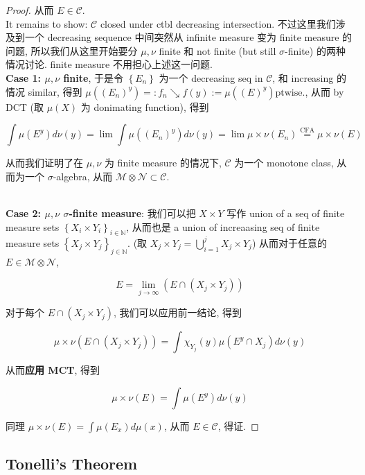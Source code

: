 \documentclass{qlnotes-export}
\begin{document}
\begin{proof}
从而 \(E \in \mathcal{C}\).\\
It remains to show: \(\mathcal{C}\) closed under ctbl decreasing intersection. 不过这里我们涉及到一个 decreasing sequence 中间突然从 infinite measure 变为 finite measure 的问题, 所以我们从这里开始要分 \(\mu,\nu\) finite 和 not finite (but still \(\sigma\)-finite) 的两种情况讨论. finite measure 不用担心上述这一问题.\\
\textbf{Case 1: \(\mu,\nu\) finite}, 于是令 \(\left\{ E_{n} \right\}\) 为一个 decreasing seq in \(\mathcal{C}\), 和 increasing 的情况 similar, 得到 \(\mu((E_{n})^{y}) = :f_{n}\operatorname{\searrow ︎}f(y) := \mu((E)^{y})\text{ptwise.}\), 从而 by DCT (取 \(\mu(X)\) 为 donimating function), 得到

\[\int\mu(E^{y}) d\nu(y) = \lim\int\mu((E_{n})^{y}) d\nu(y) = \lim\mu \times \nu(E_{n})\overset{\text{CFA}}{=}\mu \times \nu(E)\]

从而我们证明了在 \(\mu,\nu\) 为 finite measure 的情况下, \(\mathcal{C}\) 为一个 monotone class, 从而为一个 \(\sigma\)-algebra, 从而 \(\mathcal{M} \otimes \mathcal{N} \subset \mathcal{C}\).\\
\strut \\
\textbf{Case 2: \(\mu,\nu\) \(\sigma\)-finite measure}: 我们可以把 \(X \times Y\) 写作 union of a seq of finite measure sets \(\left\{ {X_{i} \times Y_{i}} \right\}_{i \in {\mathbb{N}}}\), 从而也是 a union of increaasing seq of finite measure sets \(\left\{ {X_{j} \times Y_{j}} \right\}_{j \in {\mathbb{N}}}\). (取 \(X_{j} \times Y_{j} = \bigcup_{i = 1}^{j}X_{j} \times Y_{j}\)) 从而对于任意的 \(E \in \mathcal{M} \otimes \mathcal{N}\),

\[E = \lim\limits_{j\rightarrow\infty}(E \cap (X_{j} \times Y_{j}))\]

对于每个 \(E \cap (X_{j} \times Y_{j})\), 我们可以应用前一结论, 得到

\[\mu \times \nu(E \cap (X_{j} \times Y_{j})) = \int\chi_{Y_{j}}(y)\mu(E^{y} \cap X_{j}) d\nu(y)\]

从而\textbf{应用 MCT}, 得到

\[\mu \times \nu(E) = \int\mu(E^{y}) d\nu(y)\]

同理 \(\mu \times \nu(E) = \int\mu(E_{x}) d\mu(x)\), 从而 \(E \in \mathcal{C}\), 得证.

\end{proof}

\subsection{Tonelli's Theorem}\label{tonellis-theorem}
\end{document}
